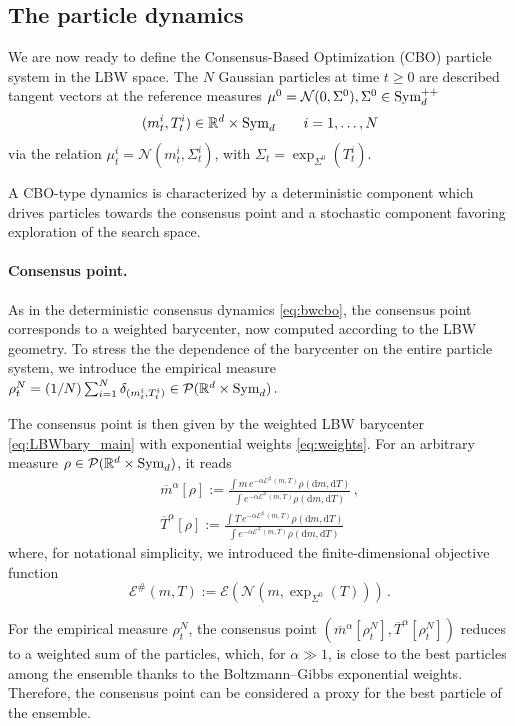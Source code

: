 \documentclass{article}
\theoremstyle{plain}
\theoremstyle{definition}
\theoremstyle{remark}
\newcommand{\Rd}{ {\mathbb{R}^d}}
\newcommand{\E}{\mathcal{E}}
\renewcommand{\d}{\mathrm{d}}
\newcommand{\sym}{\textup{Sym}_d}
\newcommand{\pd}{\textup{Sym}^{++}_d}
\begin{document}
\subsection{The particle dynamics}

We are now ready to define the Consensus-Based Optimization (CBO) particle system in the LBW space. The $N$ Gaussian particles at time $t\geq 0$ are described tangent vectors at the reference measures $\mu^0 = \mathcal{N}(0,\Sigma^0), \Sigma^0 \in \pd$
\[
(m_t^i, T_t^i)\in \Rd\times \sym \qquad i = 1, \dots, N
\]
via the relation 
$ \mu_t^i = \mathcal{N}\left( m^i_t,\Sigma_t^i   \right)$, with $\Sigma_t = \exp_{\Sigma^0}(T^i_t)$.

A CBO-type dynamics \cite{pinnau2017consensus} is characterized by a deterministic component which drives particles towards the consensus point and a stochastic component favoring exploration of the search space.

\paragraph{Consensus point.} As in the deterministic consensus dynamics \eqref{eq:bwcbo}, the consensus point corresponds to a weighted barycenter, now computed according to the LBW geometry.  To stress the the dependence of the barycenter on the entire particle system, we introduce the empirical measure
$
\rho_t^N = (1/N)\sum_{i=1}^N \delta_{(m^i_t, T^i_t)} \in \mathcal{P}(\Rd \times \sym)\,.
$

The consensus point is then given by the weighted LBW barycenter \eqref{eq:LBWbary_main} with exponential weights \eqref{eq:weights}. For an arbitrary measure $\rho\in \mathcal{P}(\Rd\times \sym)$, it reads
\begin{equation} \label{eq:consensus}
\begin{split}
\overline{m}^\alpha[\rho] := \frac{\int m \,e^{-\alpha \E^\#(m, T)} \rho(\d m, \d T)}{\int e^{-\alpha \E^\#(m, T)} \rho(\d m, \d T)}\,,\\
 \overline{T}^\alpha[\rho] := \frac{\int T \,e^{-\alpha \E^\#(m, T)} \rho(\d m, \d T)}{\int e^{-\alpha \E^\#(m, T)} \rho(\d m, \d T)}
 \end{split}
\end{equation}
where, for notational simplicity, we introduced the finite-dimensional objective function 
\[
\E^\#(m,T) := \E(\mathcal{N}(m, \exp_{\Sigma^0}(T)))\,.\] 

 For the empirical measure $\rho_t^N$, the consensus point  $(\overline{m}^\alpha[\rho^N_t], \overline{T}^\alpha[\rho_t^N])$ reduces to a weighted sum of the particles, which, for $\alpha\gg 1$, is close to the best particles among the ensemble thanks to the Boltzmann--Gibbs exponential weights. 
Therefore, the consensus point can be considered a proxy for the best particle of the ensemble.
\end{document}
